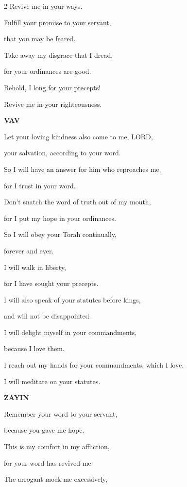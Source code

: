 \begin{multicols}{2}
	Revive me in your ways.
	
	
	\myverse{}Fulfill your promise to your servant,
	
	that you may be feared.
	
	
	\myverse{}Take away my disgrace that I dread,
	
	for your ordinances are good.
	
	
	\myverse{}Behold, I long for your precepts!
	
	Revive me in your righteousness.
	
	\vspace{\baselineskip}
	
	\textbf{VAV}
	
	
	\myverse{}Let your loving kindness also come to me, LORD,
	
	your salvation, according to your word.
	
	
	\myverse{}So I will have an answer for him who reproaches me,
	
	for I trust in your word.
	
	
	\myverse{}Don’t snatch the word of truth out of my mouth,
	
	for I put my hope in your ordinances.
	
	
	\myverse{}So I will obey your Torah continually,
	
	forever and ever.
	
	
	\myverse{}I will walk in liberty,
	
	for I have sought your precepts.
	
	
	\myverse{}I will also speak of your statutes before kings,
	
	and will not be disappointed.
	
	
	\myverse{}I will delight myself in your commandments,
	
	because I love them.
	
	
	\myverse{}I reach out my hands for your commandments, which I love.
	
	I will meditate on your statutes.
	
	\vspace{\baselineskip}
	
	\textbf{ZAYIN}
	
	
	\myverse{}Remember your word to your servant,
	
	because you gave me hope.
	
	
	\myverse{}This is my comfort in my affliction,
	
	for your word has revived me.
	
	
	\myverse{}The arrogant mock me excessively,
	

\end{multicols}
